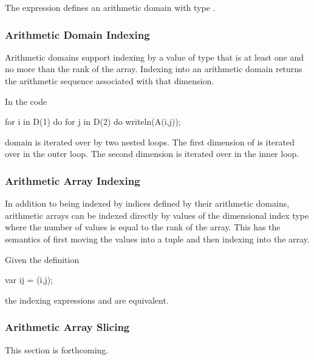 \begin{example}
The expression \chpl{[1..5, 1..5]} defines an arithmetic domain with
type .
\end{example}

\subsubsection{Arithmetic Domain Indexing}
\label{Arithmetic_Domain_Indexing}

Arithmetic domains support indexing by a value of type  that
is at least one and no more than the rank of the array.  Indexing into
an arithmetic domain returns the arithmetic sequence associated with
that dimension.

\begin{example}
In the code
\begin{chapel}
for i in D(1) do
  for j in D(2) do
    writeln(A(i,j));
\end{chapel}
domain  is iterated over by two nested loops.  The first
dimension of  is iterated over in the outer loop.  The second
dimension is iterated over in the inner loop.
\end{example}

\subsubsection{Arithmetic Array Indexing}
\label{Arithmetic_Array_Indexing}

In addition to being indexed by indices defined by their arithmetic
domains, arithmetic arrays can be indexed directly by values of the
dimensional index type where the number of values is equal to the rank
of the array.  This has the semantics of first moving the values into
a tuple and then indexing into the array.

\begin{example}
Given the definition
\begin{chapel}
  var ij = (i,j);
\end{chapel}
the indexing expressions  and  are
equivalent.
\end{example}

\subsubsection{Arithmetic Array Slicing}
\label{Arithmetic_Array_Slicing}

This section is forthcoming.

